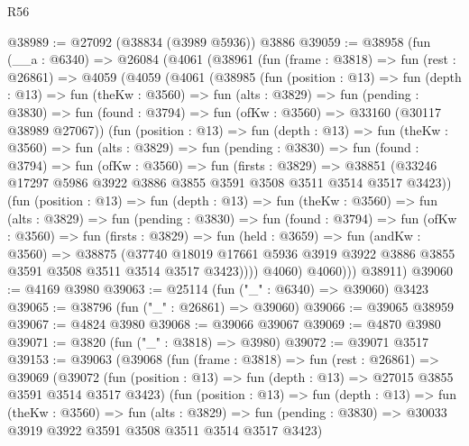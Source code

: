 \begin{lexlean}{R56}
\begin{coremodule}
@38989 := @27092 (@38834 (@3989 @5936)) @3886
@39059 := @38958
    (fun (__a : @6340) =>
    @26084
      (@4061
        (@38961
          (fun (frame : @3818) =>
          fun (rest : @26861) =>
          @4059
            (@4059
              (@4061
                (@38985
                  (fun (position : @13) =>
                  fun (depth : @13) =>
                  fun (theKw : @3560) =>
                  fun (alts : @3829) =>
                  fun (pending : @3830) =>
                  fun (found : @3794) => fun (ofKw : @3560) => @33160 (@30117 @38989 @27067))
                  (fun (position : @13) =>
                  fun (depth : @13) =>
                  fun (theKw : @3560) =>
                  fun (alts : @3829) =>
                  fun (pending : @3830) =>
                  fun (found : @3794) =>
                  fun (ofKw : @3560) =>
                  fun (firsts : @3829) =>
                  @38851
                    (@33246 @17297 @5986 @3922 @3886 @3855 @3591 @3508 @3511 @3514 @3517 @3423))
                  (fun (position : @13) =>
                  fun (depth : @13) =>
                  fun (theKw : @3560) =>
                  fun (alts : @3829) =>
                  fun (pending : @3830) =>
                  fun (found : @3794) =>
                  fun (ofKw : @3560) =>
                  fun (firsts : @3829) =>
                  fun (held : @3659) =>
                  fun (andKw : @3560) =>
                  @38875
                    (@37740
                      @18019
                      @17661
                      @5936
                      @3919
                      @3922
                      @3886
                      @3855
                      @3591
                      @3508
                      @3511
                      @3514
                      @3517
                      @3423))))
              @4060)
            @4060)))
      @38911)
@39060 := @4169 @3980
@39063 := @25114 (fun ("_" : @6340) => @39060) @3423
@39065 := @38796 (fun ("_" : @26861) => @39060)
@39066 := @39065 @38959
@39067 := @4824 @3980
@39068 := @39066 @39067
@39069 := @4870 @3980
@39071 := @3820 (fun ("_" : @3818) => @3980)
@39072 := @39071 @3517
@39153 := @39063
    (@39068
      (fun (frame : @3818) =>
      fun (rest : @26861) =>
      @39069
        (@39072
          (fun (position : @13) => fun (depth : @13) => @27015 @3855 @3591 @3514 @3517 @3423)
          (fun (position : @13) =>
          fun (depth : @13) =>
          fun (theKw : @3560) =>
          fun (alts : @3829) =>
          fun (pending : @3830) => @30033 @3919 @3922 @3591 @3508 @3511 @3514 @3517 @3423)

\end{coremodule}
\end{lexlean}
